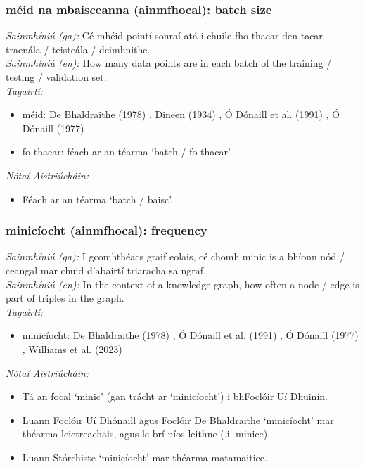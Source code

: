 \subsubsection*{méid na mbaisceanna (ainmfhocal): batch size}
 \noindent \textit{Sainmhíniú (ga):} Cé mhéid pointí sonraí atá i chuile fho-thacar den tacar traenála / teisteála / deimhnithe.
\\
 \noindent \textit{Sainmhíniú (en):} How many data points are in each batch of the training / testing / validation set.
\\
 \noindent \textit{Tagairtí:}
\begin{itemize}
	\item méid: De Bhaldraithe (1978) \cite{de-bhaldraithe}, Dineen (1934) \cite{dineen}, Ó Dónaill et al. (1991) \cite{focloir-beag}, Ó Dónaill (1977) \cite{odonaill}
	\item fo-thacar: féach ar an téarma `batch / fo-thacar'
\end{itemize}

 \noindent \textit{Nótaí Aistriúcháin:}
\begin{itemize}
	\item Féach ar an téarma `batch / baisc'.
\end{itemize}


\subsubsection*{minicíocht (ainmfhocal): frequency}
 \noindent \textit{Sainmhíniú (ga):} I gcomhthéacs graif eolais, cé chomh minic is a bhíonn nód / ceangal mar chuid d'abairtí triaracha sa ngraf.
\\
 \noindent \textit{Sainmhíniú (en):} In the context of a knowledge graph, how often a node / edge is part of triples in the graph.
\\
 \noindent \textit{Tagairtí:}
\begin{itemize}
	\item minicíocht: De Bhaldraithe (1978) \cite{de-bhaldraithe}, Ó Dónaill et al. (1991) \cite{focloir-beag}, Ó Dónaill (1977) \cite{odonaill}, Williams et al. (2023) \cite{storchiste}
\end{itemize}

 \noindent \textit{Nótaí Aistriúcháin:}
\begin{itemize}
	\item Tá an focal `minic' (gan trácht ar `minicíocht') i bhFoclóir Uí Dhuinín.
	\item Luann Foclóir Uí Dhónaill agus Foclóir De Bhaldraithe `minicíocht' mar théarma leictreachais, agus le brí níos leithne (.i. minice).
	\item Luann Stórchiste `minicíocht' mar théarma matamaitice.
\end{itemize}


